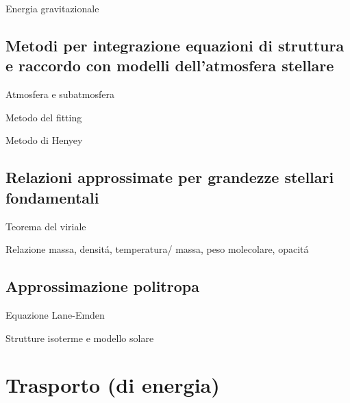 \begin{frame}{Energia gravitazionale}

\end{frame}

\subsection{Metodi per integrazione equazioni di struttura e raccordo con modelli dell'atmosfera stellare}

\begin{frame}{Atmosfera e subatmosfera}

\end{frame}

\begin{frame}{Metodo del fitting}

\end{frame}

\begin{frame}{Metodo di Henyey}

\end{frame}

\subsection{Relazioni approssimate per grandezze stellari fondamentali}

\begin{frame}{Teorema del viriale}

\end{frame}

\begin{frame}{Relazione massa, densit\'a, temperatura/ massa, peso molecolare, opacit\'a}

\end{frame}

\subsection{Approssimazione politropa}

\begin{frame}{Equazione Lane-Emden}

\end{frame}

\begin{frame}{Strutture isoterme e modello solare}

\end{frame}

\section{Trasporto (di energia)}

